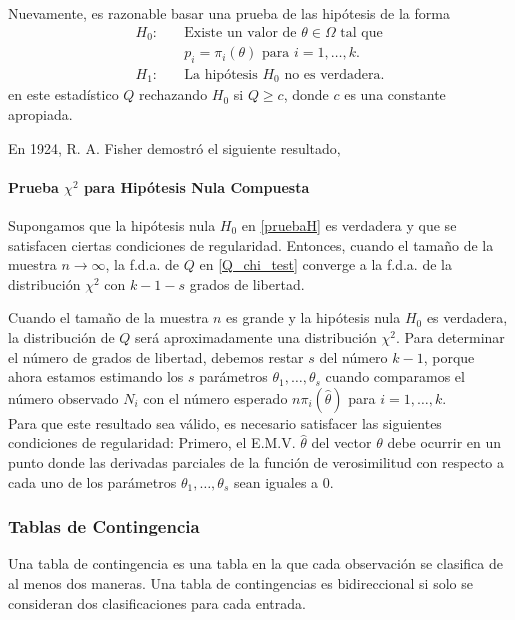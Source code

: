 \documentclass{book}
\begin{document}
Nuevamente, es razonable basar una prueba de las hipótesis de la forma
\begin{align} \label{pruebaH}
H_0: \quad &\text{Existe un valor de } \theta \in \Omega \text{ tal que}\\
&p_i = \pi_i(\theta) \text{ para } i = 1, \ldots, k.\\
H_1: \quad &\text{La hipótesis } H_0 \text{ no es verdadera.}
\end{align}
en este estadístico $Q$ rechazando $H_0$ si $Q \geq c$, donde $c$ es una constante apropiada. 

En 1924, R. A. Fisher demostró el siguiente resultado,

\paragraph{Prueba $\chi^2$ para Hipótesis Nula Compuesta}

Supongamos que la hipótesis nula $H_0$ en \ref{pruebaH} es verdadera y que se satisfacen ciertas condiciones de regularidad. Entonces, cuando el tamaño de la muestra $n \to \infty$, la f.d.a. de $Q$ en \ref{Q_chi_test} converge a la f.d.a. de la distribución $\chi^2$ con $k - 1 - s$ grados de libertad.

Cuando el tamaño de la muestra $n$ es grande y la hipótesis nula $H_0$ es verdadera, la distribución de $Q$ será aproximadamente una distribución $\chi^2$. Para determinar el número de grados de libertad, debemos restar $s$ del número $k - 1$, porque ahora estamos estimando los $s$ parámetros $\theta_1, \ldots, \theta_s$ cuando comparamos el número observado $N_i$ con el número esperado $n\pi_i(\hat{\theta})$ para $i = 1, \ldots, k$. \\ 
Para que este resultado sea válido, es necesario satisfacer las siguientes condiciones de regularidad: Primero, el E.M.V. $\hat{\theta}$ del vector $\theta$ debe ocurrir en un punto donde las derivadas parciales de la función de verosimilitud con respecto a cada uno de los parámetros $\theta_1, \ldots, \theta_s$ sean iguales a 0.

\subsubsection{Tablas de Contingencia}
Una tabla de contingencia es una tabla en la que cada observación se clasifica de al menos dos maneras.
Una tabla de contingencias es bidireccional si solo se consideran dos clasificaciones para cada entrada.
\end{document}
